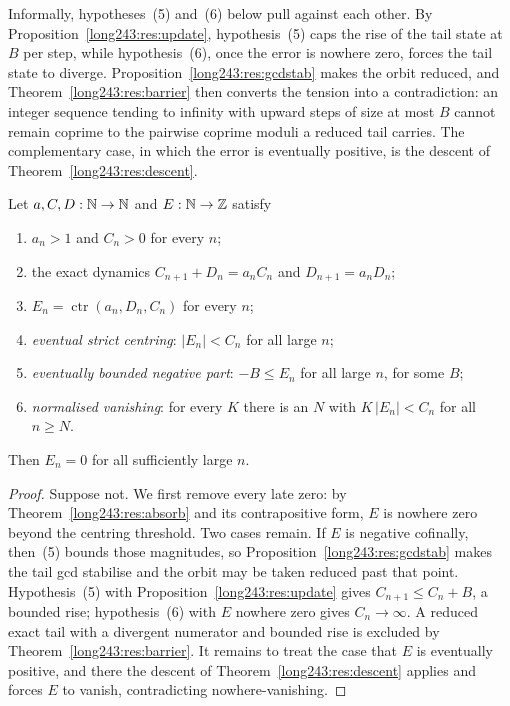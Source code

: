 \documentclass[11pt]{article}
\newcommand{\ctr}{\operatorname{ctr}}
\begin{document}
Informally, hypotheses~(5) and~(6) below pull against each other.  By
Proposition~\ref{long243:res:update}, hypothesis~(5) caps the rise of the tail state at
$B$ per step, while hypothesis~(6), once the error is nowhere zero, forces the
tail state to diverge.  Proposition~\ref{long243:res:gcdstab} makes the orbit reduced,
and Theorem~\ref{long243:res:barrier} then converts the tension into a contradiction:
an integer sequence tending to infinity with upward steps of size at most $B$
cannot remain coprime to the pairwise coprime moduli a reduced tail carries.
The
complementary case, in which the error is eventually positive, is the descent
of Theorem~\ref{long243:res:descent}.

\begin{theorem}\label{long243:res:bounded}
Let $a,C,D:\mathbb{N}\to\mathbb{N}$ and $E:\mathbb{N}\to\mathbb{Z}$ satisfy
\begin{enumerate}
\item $a_n>1$ and $C_n>0$ for every $n$;
\item the exact dynamics $C_{n+1}+D_n=a_nC_n$ and $D_{n+1}=a_nD_n$;
\item $E_n=\ctr(a_n,D_n,C_n)$ for every $n$;
\item \emph{eventual strict centring}: $|E_n|<C_n$ for all large $n$;
\item \emph{eventually bounded negative part}: $-B\le E_n$ for all large $n$,
for some $B$;
\item \emph{normalised vanishing}: for every $K$ there is an $N$ with
$K\,|E_n|<C_n$ for all $n\ge N$.
\end{enumerate}
Then $E_n=0$ for all sufficiently large $n$.
\end{theorem}

\begin{proof}
Suppose not.  We first remove every late zero: by Theorem~\ref{long243:res:absorb} and
its contrapositive form, $E$ is nowhere zero beyond the centring threshold.
Two cases remain.  If $E$ is negative cofinally,
then~(5) bounds those magnitudes, so Proposition~\ref{long243:res:gcdstab} makes the
tail gcd stabilise and the orbit may be taken reduced past that point.
Hypothesis~(5) with
Proposition~\ref{long243:res:update} gives $C_{n+1}\le C_n+B$, a bounded rise;
hypothesis~(6) with $E$ nowhere zero gives $C_n\to\infty$.  A reduced exact
tail with a divergent numerator and bounded rise is excluded by
Theorem~\ref{long243:res:barrier}.  It remains to treat the case that $E$ is eventually
positive, and there the descent
of Theorem~\ref{long243:res:descent} applies and forces $E$ to vanish, contradicting
nowhere-vanishing.
\end{proof}
\end{document}
